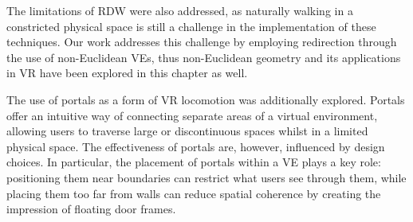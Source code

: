 The limitations of \gls{RDW} were also addressed, as naturally walking in a constricted physical space is still a challenge in the 
implementation of these techniques. Our work addresses this challenge by employing redirection through the use of non-Euclidean \glspl{VE}, 
thus non-Euclidean geometry and its applications in \gls{VR} have been explored in this chapter as well.

The use of portals as a form of \gls{VR} locomotion was additionally explored. Portals offer an intuitive way of connecting separate areas of a virtual environment, 
allowing users to traverse large or discontinuous spaces whilst in a limited physical space.
The effectiveness of portals are, however, influenced by design choices. In particular, the placement of portals within a \gls{VE} plays a key 
role: positioning them near boundaries can restrict what users see through them, while placing them too far from walls can reduce spatial 
coherence by creating the impression of floating door frames.